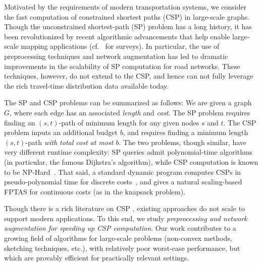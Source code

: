 Motivated by the requirements of modern transportation systems, we consider the fast computation of constrained shortest paths (CSP) in large-scale graphs. 
Though the unconstrained shortest-path (SP) problem has a long history, it has been revolutionized by recent algorithmic advancements that help enable large-scale mapping applications (cf.~\citep{goldberg_survey,dimacs09} for surveys).
In particular, the use of preprocessing techniques and network augmentation has led to dramatic improvements in the scalability of SP computation for road networks.
These techniques, however, do not extend to the CSP, and hence can not fully leverage the rich travel-time distribution data available today.

The SP and CSP problems can be summarized as follows: 
We are given a graph $G$, where each edge has an associated \emph{length} and \emph{cost}. 
The SP problem requires finding an $(s,t)$-path of minimum length for any given nodes $s$ and $t$. 
The CSP problem inputs an additional budget $b$, and requires finding a minimum length $(s,t)$-path \emph{with total cost at most $b$}.
The two problems, though similar, have very different runtime complexity: SP queries admit polynomial-time algorithms (in particular, the famous Dijkstra's algorithm), while CSP computation is known to be NP-Hard~\citep{csp_survey}.
That said, a standard dynamic program computes CSPs in pseudo-polynomial time for discrete costs~\citep{alex_bicriteria}, and gives a natural scaling-based FPTAS for continuous costs (as in the knapsack problem).

Though there is a rich literature on CSP \citep{csp_survey}, existing approaches do not scale to support modern applications. 
To this end, we study \emph{preprocessing and network augmentation for speeding up CSP computation}.
Our work contributes to a growing field of algorithms for large-scale problems (non-convex methods, sketching techniques, etc.), with relatively poor worst-case performance, but which are provably efficient for practically relevant settings.

